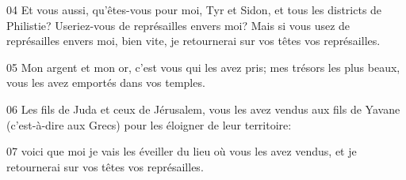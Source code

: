 
04 Et vous aussi, qu’êtes-vous pour moi, Tyr et Sidon, et tous les districts de Philistie? Useriez-vous de représailles envers moi? Mais si vous usez de représailles envers moi, bien vite, je retournerai sur vos têtes vos représailles.

05 Mon argent et mon or, c’est vous qui les avez pris; mes trésors les plus beaux, vous les avez emportés dans vos temples.

06 Les fils de Juda et ceux de Jérusalem, vous les avez vendus aux fils de Yavane (c’est-à-dire aux Grecs) pour les éloigner de leur territoire:

07 voici que moi je vais les éveiller du lieu où vous les avez vendus, et je retournerai sur vos têtes vos représailles.
